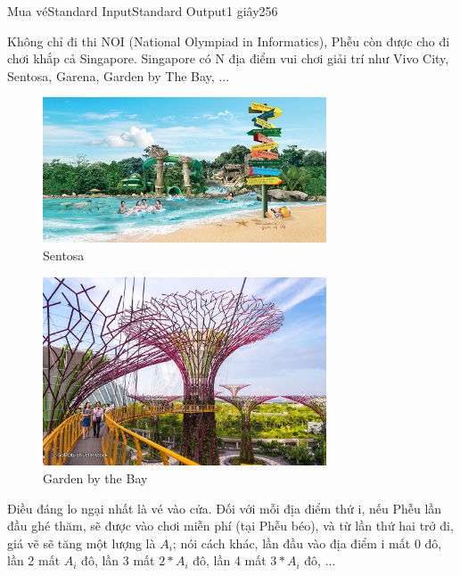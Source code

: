 \documentclass[11pt,a4paper,oneside]{article}
\begin{document}
\begin{problem}{Mua vé}{Standard Input}{Standard Output}{1 giây}{256}

Không chỉ đi thi NOI (National Olympiad in Informatics), Phễu còn được cho đi chơi khắp cả Singapore.
Singapore có N địa điểm vui chơi giải trí như Vivo City, Sentosa, Garena, Garden by The Bay, ...

\begin{figure}[h]
\centering
\includegraphics[width=0.75\textwidth]{sentosa}
\caption{Sentosa}
\end{figure}

\begin{figure}[h]
\centering
\includegraphics[width=0.75\textwidth]{gardens-by-the-bay-supertree-grove}
\caption{Garden by the Bay}
\end{figure}

Điều đáng lo ngại nhất là vé vào cửa. Đối với mỗi địa điểm thứ i, nếu Phễu lần đầu ghé thăm, sẽ được vào 
chơi miễn phí (tại Phễu béo), và từ lần thứ hai trở đi, giá vẽ sẽ tăng một lượng là $A_i$; nói cách khác,
lần đầu vào địa điểm i mất 0 đô, lần 2 mất $A_i$ đô, lần 3 mất $2 * A_i$ đô, lần 4 mất $3 * A_i$ đô, ...


\end{problem}
\end{document}
